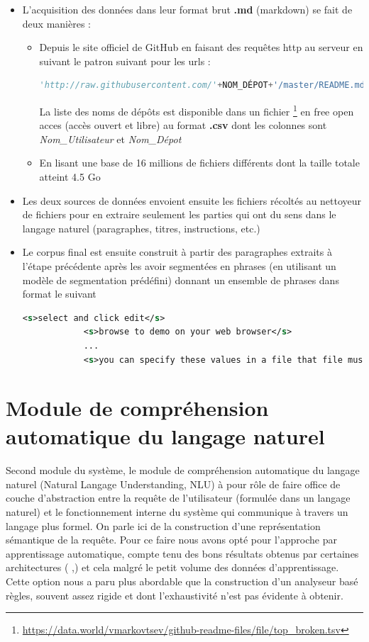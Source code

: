 		\begin{itemize}
			\item L'acquisition des données dans leur format brut \textbf{.md} (markdown) se fait de deux manières :
			\begin{itemize}
				\item Depuis le site officiel de GitHub en faisant des requêtes http au serveur en suivant le patron suivant pour les urls : 
				\begin{lstlisting}[language=python]
				'http://raw.githubusercontent.com/'+NOM_DÉPOT+'/master/README.md'\end{lstlisting}
				La liste des noms de dépôts est disponible dans un fichier \footnote{\url{https://data.world/vmarkovtsev/github-readme-files/file/top_broken.tsv}} en free open acces (accès ouvert et libre) au format \textbf{.csv} dont les colonnes sont \textit{Nom\_Utilisateur} et \textit{Nom\_Dépot} 
				\item En lisant une base de 16 millions de fichiers différents dont la taille totale atteint 4.5 Go  
			\end{itemize}
			\item Les deux sources de données envoient ensuite les fichiers récoltés au nettoyeur de fichiers pour en extraire seulement les parties qui ont du sens dans le langage naturel (paragraphes, titres, instructions, etc.)
			\item Le corpus final est ensuite construit à partir des paragraphes extraits à l'étape précédente après les avoir segmentées en phrases (en utilisant un modèle de segmentation prédéfini) donnant un ensemble de phrases dans format le suivant \begin{lstlisting}[language=xml]
			<s>select and click edit</s>
			<s>browse to demo on your web browser</s>
			...
			<s>you can specify these values in a file that file must be hom</s>\end{lstlisting}
		\end{itemize}
	

\section{Module de compréhension automatique du langage naturel}
\paragraph{}
Second module du système, le module de compréhension automatique du langage naturel (Natural Langage Understanding, NLU) à pour rôle de faire office de couche d'abstraction entre la requête de l'utilisateur (formulée dans un langage naturel) et le fonctionnement interne du système qui communique à travers un langage plus formel. On parle ici de la construction d'une représentation sémantique de la requête. Pour ce faire nous avons opté pour l'approche par apprentissage automatique, compte tenu des bons résultats obtenus par certaines architectures ( \citep{intent_slots},\citep{intent_classification}) et cela malgré le petit volume des données d'apprentissage. Cette option nous a paru plus abordable que la construction d'un analyseur basé règles, souvent assez rigide et dont l'exhaustivité n'est pas évidente à obtenir.
